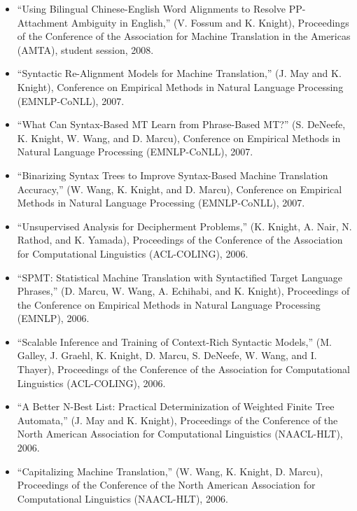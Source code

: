 \begin{itemize}
\item ``Using Bilingual Chinese-English Word Alignments to 
Resolve PP-Attachment Ambiguity in English,'' (V. Fossum and K. Knight), 
Proceedings of the Conference of the Association for Machine
Translation in the Americas (AMTA), 
student session, 2008.

\item ``Syntactic Re-Alignment Models for Machine Translation,''
(J. May and K. Knight), 
Conference on Empirical Methods in Natural Language Processing (EMNLP-CoNLL), 
2007.

\item ``What Can Syntax-Based MT Learn from Phrase-Based MT?''
(S. DeNeefe, K. Knight, W. Wang, and D. Marcu),
Conference on Empirical Methods in Natural Language Processing (EMNLP-CoNLL), 
2007.

\item ``Binarizing Syntax Trees to Improve Syntax-Based Machine
Translation Accuracy,'' (W. Wang, K. Knight, and D. Marcu),
Conference on Empirical Methods in Natural Language Processing (EMNLP-CoNLL), 
2007.

\item ``Unsupervised Analysis for Decipherment Problems,'' (K. Knight,
A. Nair, N. Rathod, and K. Yamada), 
Proceedings of the Conference of the 
Association for Computational Linguistics (ACL-COLING), 
2006.

\item ``SPMT: Statistical Machine Translation with Syntactified Target Language Phrases,'' (D. Marcu, W. Wang, A. Echihabi, and K. Knight), 
Proceedings of the Conference on
Empirical Methods in Natural Language Processing (EMNLP), 2006.

\item ``Scalable Inference and Training of Context-Rich Syntactic Models,'' 
(M. Galley, J. Graehl, K. Knight, D. Marcu, S. DeNeefe, W. Wang, 
and I. Thayer), 
Proceedings of the Conference of the 
Association for Computational Linguistics (ACL-COLING), 
2006.

\item ``A Better N-Best List:  Practical Determinization of Weighted
Finite Tree Automata,''
(J. May and K. Knight), 
Proceedings of the Conference of the 
North American Association for Computational Linguistics (NAACL-HLT), 
2006.  

\item ``Capitalizing Machine Translation,''
(W. Wang, K. Knight, D. Marcu), 
Proceedings of the Conference of the 
North American Association for Computational Linguistics (NAACL-HLT), 
2006.  


\end{itemize}
